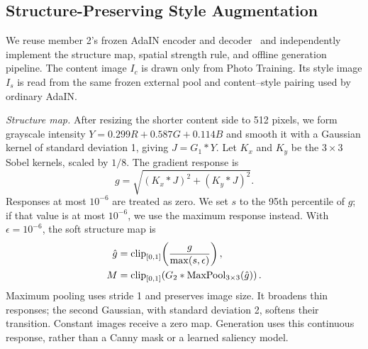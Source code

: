\subsection{Structure-Preserving Style Augmentation}
\label{sec:structure_preserving}

We reuse member 2's frozen AdaIN encoder and decoder~\cite{huang2017adain} and
independently implement the structure map, spatial strength rule, and offline
generation pipeline. The content image $I_c$ is drawn only from Photo Training.
Its style image $I_s$ is read from the same frozen external pool and content--style
pairing used by ordinary AdaIN.

\textit{Structure map.} After resizing the shorter content side to 512 pixels,
we form grayscale intensity $Y=0.299R+0.587G+0.114B$ and smooth it with a Gaussian
kernel of standard deviation 1, giving $J=G_1*Y$. Let $K_x$ and $K_y$ be the
$3\times3$ Sobel kernels, scaled by $1/8$. The gradient response is
\begin{equation}
g=\sqrt{(K_x*J)^2+(K_y*J)^2}.
\label{eq:m3_gradient}
\end{equation}
Responses at most $10^{-6}$ are treated as zero. We set $s$ to the 95th percentile
of $g$; if that value is at most $10^{-6}$, we use the maximum response instead.
With $\epsilon=10^{-6}$, the soft structure map is
\begin{align}
\hat g&=\operatorname{clip}_{[0,1]}\!\left(\frac{g}{\max(s,\epsilon)}\right),\notag\\
M&=\operatorname{clip}_{[0,1]}\!\left(G_2*\operatorname{MaxPool}_{3\times3}(\hat g)\right).
\label{eq:m3_structure}
\end{align}
Maximum pooling uses stride 1 and preserves image size. It broadens thin responses;
the second Gaussian, with standard deviation 2, softens their transition.
Constant images receive a zero map. Generation uses this continuous response,
rather than a Canny mask or a learned saliency model.

